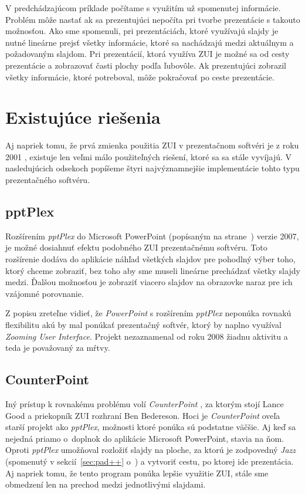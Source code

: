 V predchádzajúcom príklade počítame s využitím už spomenutej informácie. Problém môže nastať ak sa prezentujúci nepočíta pri tvorbe prezentácie s takouto možnosťou. Ako sme spomenuli, pri prezentáciách, ktoré využívajú slajdy je nutné lineárne prejsť všetky informácie, ktoré sa nachádzajú medzi aktuálnym a požadovaným slajdom. Pri prezentácií, ktorá využíva ZUI je možné sa  od cesty prezentácie a zobrazovať časti plochy podľa ľubovôle. Ak prezentujúci zobrazil všetky informácie, ktoré potreboval, môže pokračovať po ceste prezentácie.

\section{Existujúce riešenia}

Aj napriek tomu, že prvá zmienka použitia ZUI v prezentačnom softvéri je z roku 2001 \cite{counterpoint}, existuje len veľmi málo použiteľných riešení, ktoré sa sa stále vyvíjajú. V nasledujúcich odsekoch popíšeme štyri najvýznamnejšie implementácie tohto typu prezentačného softvéru.

\subsection{pptPlex}

Rozšírením \textit{pptPlex} do Microsoft PowerPoint (popísaným na strane~\pageref{sec:powerpoint}) verzie 2007, je možné dosiahnuť efektu podobného ZUI prezentačnému softvéru. Toto rozšírenie dodáva do aplikácie náhľad všetkých slajdov pre pohodlný výber toho, ktorý chceme zobraziť, bez toho aby sme museli lineárne prechádzať všetky slajdy medzi. Ďalšou možnosťou je zobraziť viacero slajdov na obrazovke naraz pre ich vzájomné porovnanie.

Z popisu zreteľne vidieť, že \textit{PowerPoint} s rozšírením \textit{pptPlex} neponúka rovnakú flexibilitu akú by mal ponúkať prezentačný softvér, ktorý by naplno využíval \textit{Zooming User Interface}. Projekt nezaznamenal od roku 2008 žiadnu aktivitu a teda je považovaný za mŕtvy.

\subsection{CounterPoint}

Iný prístup k rovnakému problému volí \textit{CounterPoint} \cite{counterpoint}, za ktorým stojí Lance Good a priekopník ZUI rozhraní Ben Bedereson. Hoci je \textit{CounterPoint} oveľa starší projekt ako \textit{pptPlex}, možnosti ktoré ponúka sú podstatne väčšie. Aj keď sa nejedná priamo o~doplnok do aplikácie Microsoft PowerPoint, stavia na ňom. Oproti \textit{pptPlex} umožňoval rozložiť slajdy na ploche, za ktorú je zodpovedný \textit{Jazz} (spomenutý v sekcií~\ref{sec:pad++} o~) a vytvoriť cestu, po ktorej ide prezentácia. Aj napriek tomu, že tento program ponúka lepšie využitie ZUI, stále sme obmedzení len na prechod medzi jednotlivými slajdami.

